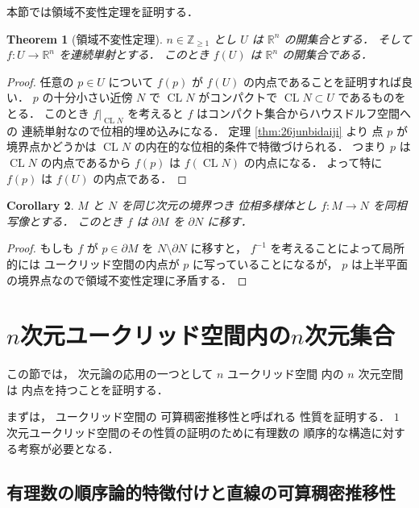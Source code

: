 \documentclass[leqno, a4paper, 12pt]{jsarticle}
\theoremstyle{plain}
\newtheorem{thm}{Theorem}[section]
\newtheorem{cor}[thm]{Corollary}
\theoremstyle{definition}
\theoremstyle{remark}
\newcommand{\zz}{\mathbb{Z}}
\newcommand{\rr}{\mathbb{R}}
\DeclareMathOperator{\cl}{\mathrm{CL}}
\numberwithin{equation}{section}
\begin{document}
本節では領域不変性定理を証明する．
\begin{thm}[領域不変性定理]\label{thm:maininvdomain}
$n\in \zz_{\ge 1}$
とし
$U$
は
$\rr^{n}$
の開集合とする．
そして
$f\colon U\to \rr^{n}$
を連続単射とする．
このとき
$f(U)$
は
$\rr^{n}$
の開集合である．
\end{thm}
\begin{proof}
任意の
$p\in U$
について
$f(p)$
が
$f(U)$
の内点であることを証明すれば良い．
$p$
の十分小さい近傍
$N$
で
$\cl N$
がコンパクトで
$\cl N \subset U$
であるものをとる．
このとき
$f|_{\cl N}$
を考えると
$f$
はコンパクト集合からハウスドルフ空間への
連続単射なので位相的埋め込みになる．
定理
\ref{thm:26junbidaiji}
より
点
$p$
が境界点かどうかは
$\cl N$
の内在的な位相的条件で特徴づけられる．
つまり
$p$
は
$\cl N$
の内点であるから
$f(p)$
は
$f(\cl N)$
の内点になる．
よって特に
$f(p)$
は
$f(U)$
の内点である．
\end{proof}


\begin{cor}
$M$
と
$N$
を同じ次元の境界つき
位相多様体とし
$f\colon M\to N$
を同相写像とする．
このとき
$f$
は
$\partial M$
を
$\partial N$
に移す．
\end{cor}
\begin{proof}
もしも
$f$
が
$p\in \partial M$
を
$N\setminus \partial N$
に移すと，
$f^{-1}$
を考えることによって局所的には
ユークリッド空間の内点が
$p$
に写っていることになるが，
$p$
は上半平面の境界点なので領域不変性定理に矛盾する．
\end{proof}




\section{$n$次元ユークリッド空間内の$n$次元集合}\label{sec:interiorndim}
この節では，
次元論の応用の一つとして
$n$
ユークリッド空間
内の
$n$
次元空間は
内点を持つことを証明する．

まずは，
ユークリッド空間の
可算稠密推移性と呼ばれる
性質を証明する．
$1$
次元ユークリッド空間のその性質の証明のために有理数の
順序的な構造に対する考察が必要となる．
\subsection{有理数の順序論的特徴付けと直線の可算稠密推移性}\label{subsec:charaqq}
\end{document}
